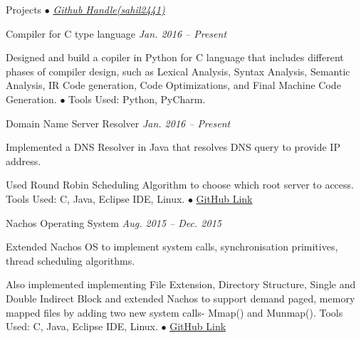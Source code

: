 \documentclass{resume} %
\begin{document}
\begin{rSection}{Projects {$\bullet$} \emph{\href{http://www.github.com/sahil2441}{\footnotesize Github Handle(sahil2441)}}}


\begin{rSubsection}{Compiler for C type language} {\emph {Jan. 2016 -- Present}}{}{}
\item Designed and build a copiler in Python for C language that includes different phases of compiler design, such as  
Lexical Analysis, Syntax Analysis, Semantic Analysis, IR Code generation, Code Optimizations, and Final Machine Code Generation.
{\tiny$\bullet$} Tools Used: Python, PyCharm. 
\end{rSubsection}


\begin{rSubsection}{Domain Name Server Resolver} {\emph {Jan. 2016 -- Present}}{}{}
\item Implemented a DNS Resolver in Java that resolves DNS query to provide IP address.
\item Used Round Robin Scheduling Algorithm to choose which root server to access. Tools Used: C, Java, Eclipse IDE, Linux. {\tiny$\bullet$}     
\href{https://github.com/sahil2441/Nachos-Operating-System}{GitHub Link}
\end{rSubsection}


\begin{rSubsection}{Nachos Operating System} {\emph {Aug. 2015 -- Dec. 2015}}{}{}
\item Extended Nachos OS to implement system calls, synchronisation primitives, thread scheduling algorithms.
\item Also implemented implementing File Extension, Directory Structure, Single and Double Indirect Block and 
extended Nachos to support demand paged, memory mapped files by adding two new system calls- Mmap() and Munmap().
Tools Used: C, Java, Eclipse IDE, Linux. {\tiny$\bullet$}     
\href{https://github.com/sahil2441/Nachos-Operating-System}{GitHub Link}
\end{rSubsection}


\end{rSection}
\end{document}

